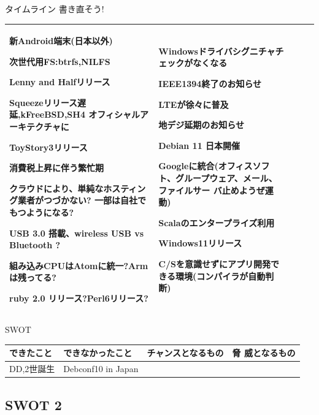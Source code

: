 \begin{frame}{タイムライン 書き直そう!}
{\begin{tabular}[t]{|p{4em}|p{4em}|p{9em}|p{7em}|p{6em}|}
新Android端末(日本以外)

次世代用FS:btrfs,NILFS

Lenny and Halfリリース

Squeezeリリース遅延,kFreeBSD,SH4 オフィシャルアーキテクチャに

ToyStory3リリース

消費税上昇に伴う繁忙期

クラウドにより、単純なホスティング業者がつづかない?
一部は自社でもつようになる?

USB 3.0 搭載、wireless USB vs Bluetooth ?

組み込みCPUはAtomに統一?Armは残ってる?

ruby 2.0 リリース?Perl6リリース?

&
Windowsドライバシグニチャチェックがなくなる

IEEE1394終了のお知らせ

LTEが徐々に普及

地デジ延期のお知らせ

Debian 11 日本開催

Googleに統合(オフィスソフト、グループウェア、メール、ファイルサー
		 バ止めようぜ運動)

Scalaのエンタープライズ利用

Windows11リリース

C/Sを意識せずにアプリ開発できる環境(コンパイラが自動判断)

\\

\hline
\end{tabular}

}
\end{frame}

\begin{frame}{SWOT}

{\tiny
\begin{tabular}[t]{|p{8em}|p{8em}|p{8em}|p{8em}|}
\hline
できたこと & できなかったこと & チャンスとなるもの & 脅
 威となるもの \\
\hline
DD,2世誕生




&
Debconf10 in Japan

&
	 

&

\\
\hline
\end{tabular}
}
\end{frame}
\subsection{SWOT 2}

